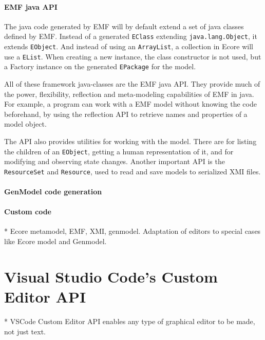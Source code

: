 \paragraph{\acrshort{EMF} java \acrshort{API}}
The java code generated by \acrshort{EMF} will by default extend a set of java classes defined by \acrshort{EMF}.
Instead of a generated \texttt{EClass} extending \texttt{java.lang.Object}, it extends \texttt{EObject}.
And instead of using an \texttt{ArrayList}, a collection in \gls{Ecore} will use a \texttt{EList}.
When creating a new instance, the class constructor is not used, but a Factory instance on the generated \texttt{EPackage} for the model.


All of these framework java-classes are the \acrshort{EMF} java \gls{API}.
They provide much of the power, flexibility, reflection and meta-modeling capabilities of \acrshort{EMF} in java.
For example, a program can work with a \acrshort{EMF} model without knowing the code beforehand, by using the reflection \acrshort{API} to retrieve names and properties of a model object.


The \acrshort{API} also provides utilities for working with the model.
There are  for listing the children of an \texttt{EObject}, getting a human representation of it, and for modifying and observing state changes.
Another important \acrshort{API} is the \texttt{ResourceSet} and \texttt{Resource}, used to read and save models to serialized \acrshort{XMI} files.

\paragraph{GenModel code generation}


\paragraph{Custom code}


* Ecore metamodel, EMF, XMI, genmodel. Adaptation of editors to special cases like Ecore model and Genmodel.

\section{Visual Studio Code's Custom Editor API}\label{sec:vscode-custom-editor}
* VSCode Custom Editor API enables any type of graphical editor to be made, not just text.

